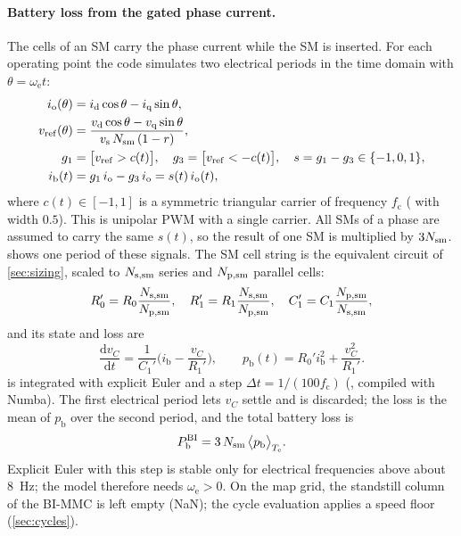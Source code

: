 \paragraph{Battery loss from the gated phase current.} The cells of an SM carry the phase current while the SM is inserted. For each operating point the code simulates two electrical periods in the time domain with $\theta=\omega_\mathrm{e}t$:
\begin{align}
i_\mathrm{o}(\theta)&=i_\mathrm{d}\cos\theta-i_\mathrm{q}\sin\theta, \label{eq:io}\\
v_\mathrm{ref}(\theta)&=\frac{v_\mathrm{d}\cos\theta-v_\mathrm{q}\sin\theta}{v_\mathrm{s}\,N_\mathrm{sm}\,(1-r)}, \label{eq:vref}\\
g_1&=\big[v_\mathrm{ref}>c(t)\big],\quad g_3=\big[v_\mathrm{ref}<-c(t)\big],\quad s=g_1-g_3\in\{-1,0,1\},\label{eq:gate}\\
i_\mathrm{b}(t)&=g_1\,i_\mathrm{o}-g_3\,i_\mathrm{o}=s(t)\,i_\mathrm{o}(t), \label{eq:ib}
\end{align}
where $c(t)\in[-1,1]$ is a symmetric triangular carrier of frequency $f_\mathrm{c}$ ( with width $0.5$). This is unipolar PWM with a single carrier. All SMs of a phase are assumed to carry the same $s(t)$, so the result of one SM is multiplied by $3N_\mathrm{sm}$.  shows one period of these signals. The SM cell string is the equivalent circuit of \cref{sec:sizing}, scaled to $N_\mathrm{s,sm}$ series and $N_\mathrm{p,sm}$ parallel cells:
\begin{equation}
R_{0}'=R_0\frac{N_\mathrm{s,sm}}{N_\mathrm{p,sm}},\quad R_{1}'=R_1\frac{N_\mathrm{s,sm}}{N_\mathrm{p,sm}},\quad C_{1}'=C_1\frac{N_\mathrm{p,sm}}{N_\mathrm{s,sm}},
\label{eq:smrc}
\end{equation}
and its state and loss are
\begin{equation}
\frac{\mathrm{d}v_C}{\mathrm{d}t}=\frac{1}{C_1'}\Big(i_\mathrm{b}-\frac{v_C}{R_1'}\Big),\qquad
p_\mathrm{b}(t)=R_0'i_\mathrm{b}^2+\frac{v_C^2}{R_1'}.
\label{eq:rcsim}
\end{equation}
 is integrated with explicit Euler and a step $\Delta t=1/(100f_\mathrm{c})$ (, compiled with Numba). The first electrical period lets $v_C$ settle and is discarded; the loss is the mean of $p_\mathrm{b}$ over the second period, and the total battery loss is
\begin{equation}
P_\mathrm{b}^\mathrm{BI}=3\,N_\mathrm{sm}\,\big\langle p_\mathrm{b}\big\rangle_{T_\mathrm{e}}.
\label{eq:pbbimmc}
\end{equation}
Explicit Euler with this step is stable only for electrical frequencies above about \SI{8}{\hertz}; the model therefore needs $\omega_\mathrm{e}>0$. On the map grid, the standstill column of the BI-MMC is left empty (NaN); the cycle evaluation applies a speed floor (\cref{sec:cycles}).


